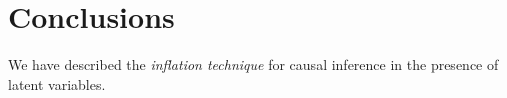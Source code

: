 \documentclass[aps,english,superscriptaddress,onecolumn,twoside,longbibliography,pra,floatfix,fleqn,nofootinbib]{revtex4-1}%
\theoremstyle{definition}
\begin{document}






\section{Conclusions}

We have described the \emph{inflation technique} for causal inference in the presence of latent variables.
\end{document}
